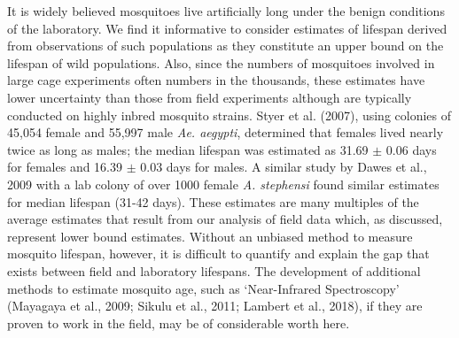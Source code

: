 \documentclass[]{article}
\begin{document}
It is widely believed mosquitoes live artificially long under the benign
conditions of the laboratory. We find it informative to consider
estimates of lifespan derived from observations of such populations as
they constitute an upper bound on the lifespan of wild populations.
Also, since the numbers of mosquitoes involved in large cage experiments
often numbers in the thousands, these estimates have lower uncertainty
than those from field experiments although are typically conducted on
highly inbred mosquito strains. Styer et al. (2007), using colonies of
45,054 female and 55,997 male \emph{Ae. aegypti}, determined that
females lived nearly twice as long as males; the median lifespan was
estimated as 31.69 $\pm$ 0.06 days for females and 16.39 $\pm$ 0.03 days
for males. A similar study by Dawes et al., 2009 with a lab colony of
over 1000 female \emph{A. stephensi} found similar estimates for median
lifespan (31-42 days). These estimates are many multiples of the average
estimates that result from our analysis of field data which, as
discussed, represent lower bound estimates. Without an unbiased method
to measure mosquito lifespan, however, it is difficult to quantify and
explain the gap that exists between field and laboratory lifespans. The
development of additional methods to estimate mosquito age, such as
`Near-Infrared Spectroscopy' (Mayagaya et al., 2009; Sikulu et al.,
2011; Lambert et al., 2018), if they are proven to work in the field,
may be of considerable worth here.
\end{document}
